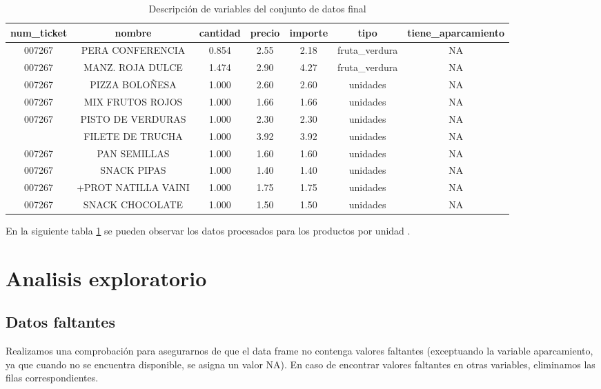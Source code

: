 \documentclass[,article,submit,moreauthors,pdftex]{Definitions/mdpi}
\begin{document}
\begin{table}

\caption{\label{tab:tabla_final}Descripción de variables del conjunto de datos final}
\centering
\begin{tabular}[t]{ccccccc}
\toprule
num\_ticket & nombre & cantidad & precio & importe & tipo & tiene\_aparcamiento\\
\midrule
007267 & PERA CONFERENCIA & 0.854 & 2.55 & 2.18 & fruta\_verdura & NA\\
007267 & MANZ. ROJA DULCE & 1.474 & 2.90 & 4.27 & fruta\_verdura & NA\\
007267 & PIZZA BOLOÑESA & 1.000 & 2.60 & 2.60 & unidades & NA\\
007267 & MIX FRUTOS ROJOS & 1.000 & 1.66 & 1.66 & unidades & NA\\
007267 & PISTO DE VERDURAS & 1.000 & 2.30 & 2.30 & unidades & NA\\
\addlinespace
007267 & FILETE DE TRUCHA & 1.000 & 3.92 & 3.92 & unidades & NA\\
007267 & PAN SEMILLAS & 1.000 & 1.60 & 1.60 & unidades & NA\\
007267 & SNACK PIPAS & 1.000 & 1.40 & 1.40 & unidades & NA\\
007267 & +PROT NATILLA VAINI & 1.000 & 1.75 & 1.75 & unidades & NA\\
007267 & SNACK CHOCOLATE & 1.000 & 1.50 & 1.50 & unidades & NA\\
\bottomrule
\end{tabular}
\end{table}

En la siguiente tabla \ref{tab:tabla_final} se pueden observar los datos
procesados para los productos por unidad .

\hypertarget{analisis-exploratorio}{%
\section{Analisis exploratorio}\label{analisis-exploratorio}}

\hypertarget{datos-faltantes}{%
\subsection{Datos faltantes}\label{datos-faltantes}}

Realizamos una comprobación para asegurarnos de que el data frame no
contenga valores faltantes (exceptuando la variable aparcamiento, ya que
cuando no se encuentra disponible, se asigna un valor NA). En caso de
encontrar valores faltantes en otras variables, eliminamos las filas
correspondientes.
\end{document}
